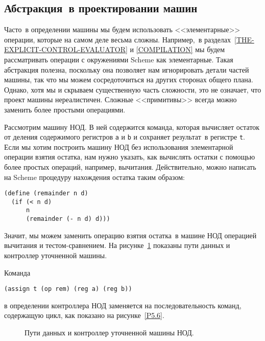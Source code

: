 \subsection{Абстракция~в проектировании машин}
\label{ABSTRACTION-IN-MACHINE-DESIGN}


Часто~в определении машины мы будем использовать
<<элементарные>> операции, которые на самом деле весьма сложны.
Например,~в разделах~\ref{THE-EXPLICIT-CONTROL-EVALUATOR}
и \ref{COMPILATION} мы будем рассматривать операции с
окружениями Scheme как элементарные.  Такая абстракция полезна,
поскольку она позволяет нам игнорировать детали частей машины, так что
мы можем сосредоточиться на других сторонах общего плана. Однако,
хотя мы и скрываем существенную часть сложности, это не означает, что
проект машины нереалистичен.  Сложные <<примитивы>> всегда можно заменить 
более простыми операциями.

Рассмотрим машину НОД.  В ней содержится команда, которая
вычисляет остаток от деления содержимого регистров {\tt a} и
{\tt b} и сохраняет результат~в регистре {\tt t}.  Если
мы хотим построить машину НОД без использования элементарной операции
взятия остатка, нам нужно указать, как вычислять остатки с помощью
более простых операций, например, вычитания.  Действительно, можно
написать на Scheme процедуру нахождения остатка таким образом:

\begin{Verbatim}[fontsize=\small]
(define (remainder n d)
  (if (< n d)
      n
      (remainder (- n d) d)))
\end{Verbatim}
Значит, мы можем заменить операцию взятия остатка~в машине НОД
операцией вычитания и тестом-сравнением.  На 
рисунке~\ref{P5.5} показаны пути данных и контроллер уточненной
машины. 

\pagebreak

Команда

\begin{Verbatim}[fontsize=\small]
(assign t (op rem) (reg a) (reg b))
\end{Verbatim}
в определении контроллера НОД заменяется на последовательность команд,
содержащую цикл, как показано на рисунке~\ref{P5.6}.


\begin{figure}[p]
\begin{center}

\caption{Пути данных и контроллер уточненной машины НОД.}
\label{P5.5}
\end{center}
\end{figure}


